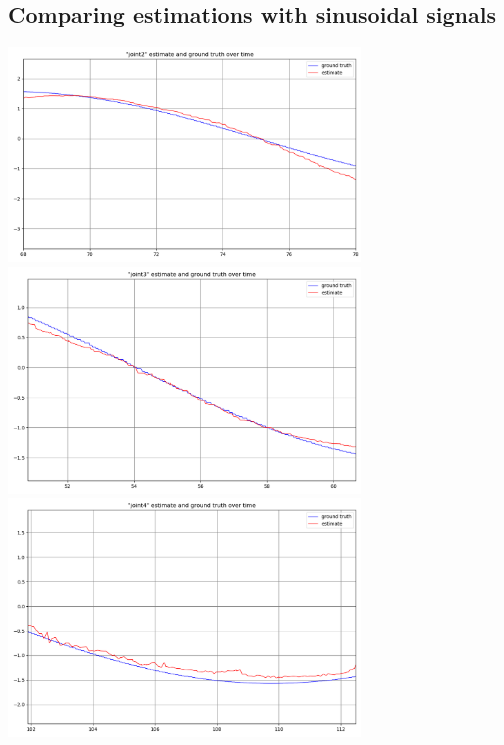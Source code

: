 \subsection{Comparing estimations with sinusoidal signals}
\begin{center}
    \includegraphics[width=0.7\textwidth]{plots/q2_1_j2_10sec.png}
    \includegraphics[width=0.7\textwidth]{plots/q2_1_j3_10sec.png}
    \includegraphics[width=0.7\textwidth]{plots/q2_1_j4_10sec.png}
\end{center}

